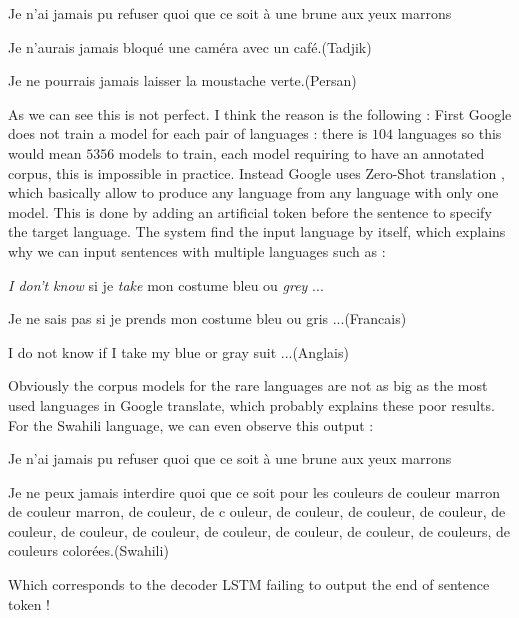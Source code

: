 \documentclass[a4paper, 11pt]{article}
\begin{document}
\begin{inputcbox}
  Je n'ai jamais pu refuser quoi que ce soit à une brune aux yeux marrons
\end{inputcbox}
\begin{outputcbox}
  Je n'aurais jamais bloqué une caméra avec un café.\hfill(Tadjik)
\end{outputcbox}
\begin{outputcbox}
  Je ne pourrais jamais laisser la moustache verte.\hfill(Persan)
\end{outputcbox}

As we can see this is not perfect. I think the reason is the following
: First Google does not train a model for each pair of languages :
there is $104$ languages so this would mean $5356$ models to train,
each model requiring to have an annotated corpus, this is impossible
in practice. Instead Google uses Zero-Shot translation
\cite{johnson2016google}, which basically allow to produce any
language from any language with only one model. This is done by adding
an artificial token before the sentence to specify the target
language. The system find the input language by itself, which explains
why we can input sentences with multiple languages such as :
\begin{inputcbox}
  \emph{I don't know} si je \emph{take} mon costume bleu ou \emph{grey} ...
\end{inputcbox}
\begin{outputcbox}
  Je ne sais pas si je prends mon costume bleu ou gris ...\hfill(Francais)
\end{outputcbox}
\begin{outputcbox}
  I do not know if I take my blue or gray suit ...\hfill(Anglais)
\end{outputcbox}
Obviously the corpus models for the rare languages are not as big as
the most used languages in Google translate, which probably explains
these poor results. For the Swahili language, we can even observe this output :
\begin{inputcbox}
  Je n'ai jamais pu refuser quoi que ce soit à une brune aux yeux marrons
\end{inputcbox}
\begin{outputcbox}
  Je ne peux jamais interdire quoi que ce soit pour les couleurs de
  couleur marron de couleur marron, de couleur, de c ouleur, de
  couleur, de couleur, de couleur, de couleur, de couleur, de couleur,
  de couleur, de couleur, de couleur, de couleurs, de couleurs
  colorées.\hfill(Swahili)
\end{outputcbox}
Which corresponds to the decoder LSTM failing to output the end of
sentence token !
\end{document}
